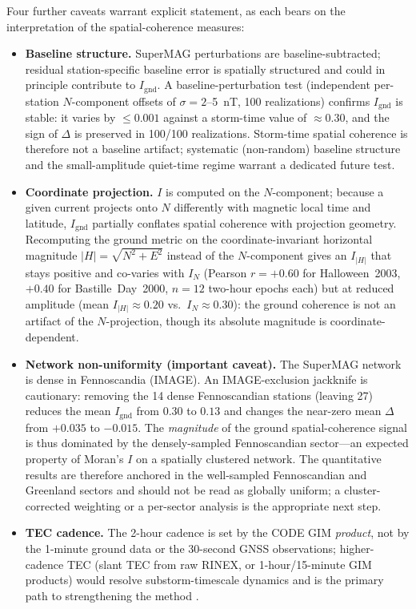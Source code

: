 \documentclass[11pt,letterpaper]{article}
\begin{document}
Four further caveats warrant explicit statement, as each bears on the
interpretation of the spatial-coherence measures:
\begin{itemize}
\item \textbf{Baseline structure.} SuperMAG perturbations are baseline-subtracted;
  residual station-specific baseline error is spatially structured and could in
  principle contribute to $I_\mathrm{gnd}$. A baseline-perturbation test
  (independent per-station $N$-component offsets of $\sigma = 2$--5~nT, 100
  realizations) confirms $I_\mathrm{gnd}$ is stable: it varies by $\le 0.001$
  against a storm-time value of $\approx 0.30$, and the sign of $\Delta$ is
  preserved in 100/100 realizations. Storm-time spatial coherence is therefore not
  a baseline artifact; systematic (non-random) baseline structure and the
  small-amplitude quiet-time regime warrant a dedicated future test.
\item \textbf{Coordinate projection.} $I$ is computed on the $N$-component;
  because a given current projects onto $N$ differently with magnetic local time
  and latitude, $I_\mathrm{gnd}$ partially conflates spatial coherence with
  projection geometry. Recomputing the ground metric on the coordinate-invariant
  horizontal magnitude $|H|=\sqrt{N^2+E^2}$ instead of the $N$-component gives an
  $I_{|H|}$ that stays positive and co-varies with $I_N$ (Pearson
  $r=+0.60$ for Halloween~2003, $+0.40$ for Bastille~Day~2000, $n=12$ two-hour
  epochs each) but at reduced amplitude (mean $I_{|H|}\approx0.20$ vs.\
  $I_N\approx0.30$): the ground coherence is not an artifact of the $N$-projection,
  though its absolute magnitude is coordinate-dependent.
\item \textbf{Network non-uniformity (important caveat).} The SuperMAG network is
  dense in Fennoscandia (IMAGE). An IMAGE-exclusion jackknife is cautionary:
  removing the 14 dense Fennoscandian stations (leaving 27) reduces the mean
  $I_\mathrm{gnd}$ from $0.30$ to $0.13$ and changes the near-zero mean $\Delta$
  from $+0.035$ to $-0.015$. The \emph{magnitude} of the ground spatial-coherence
  signal is thus dominated by the densely-sampled Fennoscandian sector---an
  expected property of Moran's $I$ on a spatially clustered network. The
  quantitative results are therefore anchored in the well-sampled Fennoscandian
  and Greenland sectors and should not be read as globally uniform; a
  cluster-corrected weighting or a per-sector analysis is the appropriate next
  step.
\item \textbf{TEC cadence.} The 2-hour cadence is set by the CODE GIM
  \emph{product}, not by the 1-minute ground data or the 30-second GNSS
  observations; higher-cadence TEC (slant TEC from raw RINEX, or 1-hour/15-minute
  GIM products) would resolve substorm-timescale dynamics and is the primary path
  to strengthening the method \citep{hernandez2009igs}.
\end{itemize}
\end{document}
